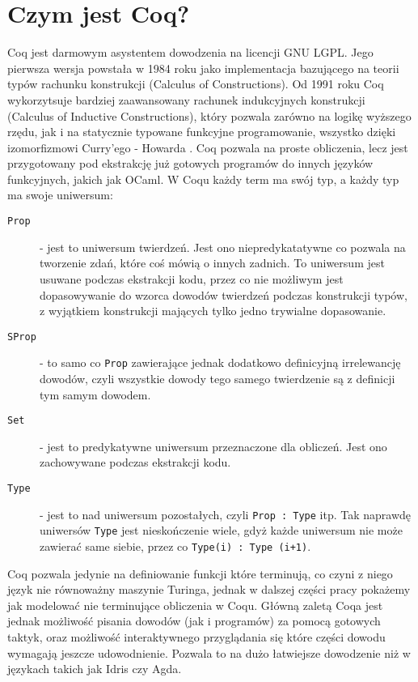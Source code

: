 \section{Czym jest Coq?}
Coq jest darmowym asystentem dowodzenia na licencji GNU LGPL. Jego pierwsza wersja powstała w 1984 roku jako implementacja bazującego na teorii typów rachunku konstrukcji (Calculus of Constructions). Od 1991 roku Coq wykorzytsuje bardziej zaawansowany rachunek indukcyjnych konstrukcji (Calculus of Inductive Constructions)\cite{cic}, który pozwala zarówno na logikę wyższego rzędu, jak i na statycznie typowane funkcyjne programowanie, wszystko dzięki izomorfizmowi Curry'ego - Howarda \cite{curry-howard}. Coq pozwala na proste obliczenia, lecz jest przygotowany pod ekstrakcję już gotowych programów do innych języków funkcyjnych, jakich jak OCaml. W Coqu każdy term ma swój typ, a każdy typ ma swoje uniwersum:
\begin{description}
    \item[\texttt{Prop}] - jest to uniwersum twierdzeń. Jest ono niepredykatatywne co pozwala na tworzenie zdań, które coś mówią o innych zadnich. To uniwersum jest usuwane podczas ekstrakcji kodu, przez co nie możliwym jest dopasowywanie do wzorca dowodów twierdzeń podczas konstrukcji typów, z wyjątkiem konstrukcji mających tylko jedno trywialne dopasowanie.
    \item[\texttt{SProp}] - to samo co \texttt{Prop} zawierające jednak dodatkowo definicyjną irrelewancję dowodów, czyli wszystkie dowody tego samego twierdzenie są z definicji tym samym dowodem.
    \item[\texttt{Set}] - jest to predykatywne uniwersum przeznaczone dla obliczeń. Jest ono zachowywane podczas ekstrakcji kodu.
    \item[\texttt{Type}] - jest to nad uniwersum pozostałych, czyli \texttt{Prop : Type} itp. Tak naprawdę uniwersów \texttt{Type} jest nieskończenie wiele, gdyż każde uniwersum nie może zawierać same siebie, przez co  \texttt{Type(i) : Type (i+1)}.
\end{description}
Coq pozwala jedynie na definiowanie funkcji które terminują, co czyni z niego język nie równoważny maszynie Turinga, jednak w dalszej części pracy pokażemy jak modelować nie terminujące obliczenia w Coqu. Główną zaletą Coqa jest jednak możliwość pisania dowodów (jak i programów) za pomocą gotowych taktyk, oraz możliwość interaktywnego przyglądania się które części dowodu wymagają jeszcze udowodnienie. Pozwala to na dużo łatwiejsze dowodzenie niż w językach takich jak Idris czy Agda.
